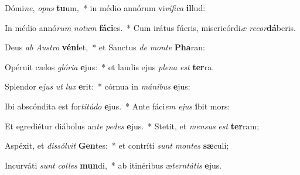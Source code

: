 \item Dómi\textit{ne}, \textit{o}\textit{pus} \textbf{tu}um,~* in médio annórum vi\textit{ví}\textit{fi}\textit{ca} \textbf{il}lud:
\item In médio annó\textit{rum} \textit{no}\textit{tum} \textbf{fá}\textbf{ci}es.~* Cum irátus fúeris, misericórdi\textit{æ} \textit{re}\textit{cor}\textbf{dá}beris.
\item Deus \textit{ab} \textit{Aus}\textit{tro} \textbf{vé}\textbf{ni}et,~* et Sanctus \textit{de} \textit{mon}\textit{te} \textbf{Pha}ran:
\item Opéruit cælos \textit{gló}\textit{ri}\textit{a} \textbf{e}jus:~* et laudis ejus \textit{ple}\textit{na} \textit{est} \textbf{ter}ra.
\item Splendor e\textit{jus} \textit{ut} \textit{lux} \textbf{e}rit:~* córnua in \textit{má}\textit{ni}\textit{bus} \textbf{e}jus:
\item Ibi abscóndita est for\textit{ti}\textit{tú}\textit{do} \textbf{e}jus.~* Ante fáci\textit{em} \textit{e}\textit{jus} \textbf{i}bit mors:
\item Et egrediétur diábolus an\textit{te} \textit{pe}\textit{des} \textbf{e}jus.~* Stetit, et \textit{men}\textit{sus} \textit{est} \textbf{ter}ram;
\item Aspéxit, et \textit{dis}\textit{sól}\textit{vit} \textbf{Gen}tes:~* et contríti \textit{sunt} \textit{mon}\textit{tes} \textbf{sæ}culi;
\item Incurváti \textit{sunt} \textit{col}\textit{les} \textbf{mun}di,~* ab itinéribus æ\textit{tern}\textit{tá}\textit{tis} \textbf{e}jus.
